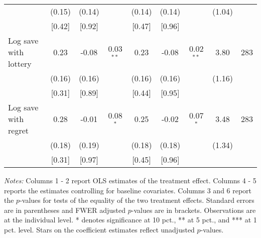 \begin{table}[htbp]
{\begin{threeparttable}
\begin{tabular}{l*{8}{c}}
          &   (0.15)&   (0.14)&         &   (0.14)&   (0.14)&         &   (1.04)&         \\
          &   [0.42]&   [0.92]&         &   [0.47]&   [0.96]&         &         &         \\
Log save with lottery&     0.23&    -0.08&0.03$^{**}$&     0.23&    -0.08&0.02$^{**}$&     3.80&      283\\
          &   (0.16)&   (0.16)&         &   (0.16)&   (0.16)&         &   (1.16)&         \\
          &   [0.31]&   [0.89]&         &   [0.44]&   [0.95]&         &         &         \\
Log save with regret&     0.28&    -0.01&0.08$^{*}$&     0.25&    -0.02&0.07$^{*}$&     3.48&      283\\
          &   (0.18)&   (0.19)&         &   (0.18)&   (0.18)&         &   (1.34)&         \\
          &   [0.31]&   [0.97]&         &   [0.45]&   [0.96]&         &         &         \\
\bottomrule \end{tabular} \begin{tablenotes}[flushleft] \footnotesize \item \emph{Notes:} Columns 1 - 2 report OLS estimates of the treatment effect. Columns 4 - 5 reports the estimates controlling for baseline covariates. Columns 3 and 6 report the \(p\)-values for tests of the equality of the two treatment effects. Standard errors are in parentheses and FWER adjusted \(p\)-values are in brackets. Observations are at the individual level. * denotes significance at 10 pct., ** at 5 pct., and *** at 1 pct. level. Stars on the coefficient estimates reflect unadjusted \(p\)-values. \end{tablenotes} \end{threeparttable} } \end{table}

